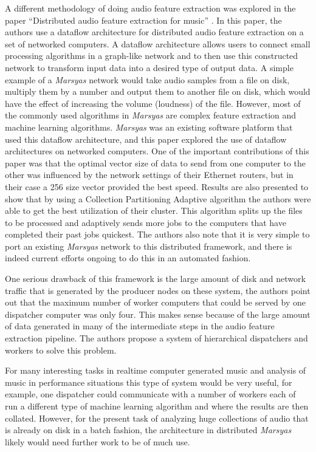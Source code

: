 \documentclass[12pt,oneside]{book}
\begin{document}
A different methodology of doing audio feature extraction was explored
in the paper ``Distributed audio feature extraction for music''
\cite{bray2005distributed}.  In this paper, the authors use a dataflow
architecture for distributed audio feature extraction on a set of
networked computers.  A dataflow architecture allows users to connect
small processing algorithms in a graph-like network and to then use
this constructed network to transform input data into a desired type
of output data.  A simple example of a \textit{Marsyas} network would take
audio samples from a file on disk, multiply them by a number and
output them to another file on disk, which would have the effect of
increasing the volume (loudness) of the file.  However, most of the
commonly used algorithms in \textit{Marsyas} are complex feature extraction and
machine learning algorithms.  \textit{Marsyas} was an existing software
platform that used this dataflow architecture, and this paper explored
the use of dataflow architectures on networked computers.  One of the
important contributions of this paper was that the optimal vector size
of data to send from one computer to the other was influenced by the
network settings of their Ethernet routers, but in their case a 256
size vector provided the best speed.  Results are also presented to
show that by using a Collection Partitioning Adaptive algorithm the
authors were able to get the best utilization of their cluster.  This
algorithm splits up the files to be processed and adaptively sends
more jobs to the computers that have completed their past jobs
quickest.  The authors also note that it is very simple to port an
existing \textit{Marsyas} network to this distributed framework, and there is
indeed current efforts ongoing to do this in an automated fashion.

One serious drawback of this framework is the large amount of disk and
network traffic that is generated by the producer nodes on these
system, the authors point out that the maximum number of worker
computers that could be served by one dispatcher computer was only
four.  This makes sense because of the large amount of data generated
in many of the intermediate steps in the audio feature extraction
pipeline.  The authors propose a system of hierarchical dispatchers
and workers to solve this problem.

For many interesting tasks in realtime computer generated music and
analysis of music in performance situations this type of system would
be very useful, for example, one dispatcher could communicate with a
number of workers each of run a different type of machine learning
algorithm and where the results are then collated.  However, for the
present task of analyzing huge collections of audio that is already on
disk in a batch fashion, the architecture in distributed \textit{Marsyas}
likely would need further work to be of much use.
\end{document}
